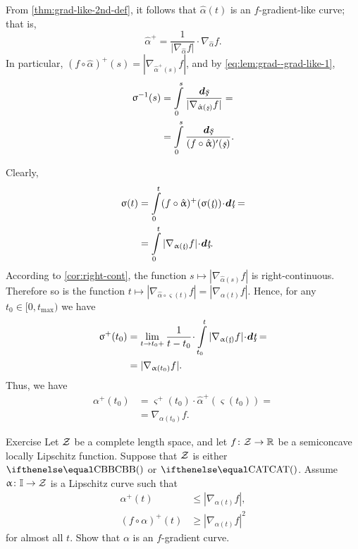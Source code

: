 From \ref{thm:grad-like-2nd-def}, it follows that $\hat\alpha(t)$ is an $f$-gradient-like curve; 
that is,
\[\hat\alpha^+=\frac{1}{|\nabla_{\hat\alpha} f|}\cdot\nabla_{\hat\alpha} f.\]
In particular, $(f\circ\hat\alpha)^+(s)=|\nabla_{\hat\alpha^+(s)} f|$, and by \ref{eq:lem:grad--grad-like-1},
\begin{align*}\varsigma^{-1}(s)
&=\int\limits_0^s\frac{\dd\under s}{|\nabla_{\hat\alpha(\under s)} f|}
=
\\
&=
\int\limits_0^s\frac{\dd\under s}{(f\circ\hat\alpha)'(\under s)}.
\end{align*}
\medskip

Clearly,
\begin{align*}\varsigma(t)
&=
\int\limits_0^{t}(f\circ\hat\alpha)^+(\varsigma(\under t))\cdot\dd \under t
=
\\
&=
\int\limits_0^{t}|\nabla_{\alpha(\under t)}f|\cdot\dd \under t.
\end{align*}
According to \ref{cor:right-cont}, the function $s\mapsto|\nabla_{\hat\alpha(s)}f|$ is right-continuous.
Therefore so is the function $t\mapsto|\nabla_{\hat\alpha\circ\varsigma(t)}f|=|\nabla_{\alpha(t)}f|$.
Hence, for any $t_0\in[0,t_{\max})$ we have
\begin{align*}\varsigma^+(t_0)
&=
\lim_{t\to t_0+}
\frac1{t-t_0}\cdot\int\limits_{t_0}^t
|\nabla_{\alpha(\under t)}f|\cdot\dd\under t
=
\\
&=
|\nabla_{\alpha(t_0)}f|.
\end{align*}
Thus, we have 
\begin{align*}\alpha^+(t_0)
&=
\varsigma^+(t_0)\cdot\hat\alpha^+(\varsigma(t_0))
=
\\
&=
\nabla_{\alpha(t_0)} f.
\end{align*}
\qedsf


\begin{thm}{Exercise}\label{ex:grad-curve-condition}
Let $\mathcal{Z}$ be a complete length space, and let
$f\:\spc{Z}\to \RR$ be a semiconcave locally Lipschitz 
function.
Suppose that $\mathcal{Z}$ is either $\Alex{}$ or $\CAT{}$.
Assume $\alpha\:\II\to \spc{Z}$ is a Lipschitz curve such that 
\begin{align*}
\alpha^+(t)&\le|\nabla_{\alpha(t)}f|,
\\
(f\circ\alpha)^+(t)&\ge |\nabla_{\alpha(t)}f|^2
\end{align*}
for almost all $t$.
Show that $\alpha$ is an $f$-gradient curve.
\end{thm}



